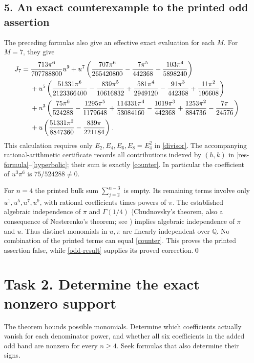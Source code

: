 \documentclass[11pt]{article}
\newcommand{\Q}{\mathbb Q}
\begin{document}
\subsection*{5. An exact counterexample to the printed odd assertion}
The preceding formulas also give an effective exact evaluation for
each $M$. For $M=7$, they give
\begin{align}
 J_7={}&\frac{713\pi^6}{707788800}u^9
 +u^7\left(\frac{707\pi^6}{265420800}
        -\frac{7\pi^5}{442368}+\frac{103\pi^4}{5898240}\right)\notag\\
 &+u^5\left(\frac{51331\pi^6}{2123366400}
       -\frac{839\pi^5}{10616832}+\frac{581\pi^4}{2949120}
       -\frac{91\pi^3}{442368}+\frac{11\pi^2}{196608}\right)\notag\\
 &+u^3\left(\frac{75\pi^6}{524288}-\frac{1295\pi^5}{1179648}
       +\frac{114331\pi^4}{53084160}-\frac{1019\pi^3}{442368}
       +\frac{1253\pi^2}{884736}-\frac{7\pi}{24576}\right)\notag\\
 &+u\left(\frac{51331\pi^2}{8847360}
                         -\frac{839\pi}{221184}\right).\label{counter}
\end{align}
This calculation requires only $E_2,E_4,E_6,E_8=E_4^2$ in
\eqref{divisor}. The accompanying rational-arithmetic certificate
records all contributions indexed by $(h,k)$ in
\eqref{res-formula}--\eqref{hyperbolic}; their sum is exactly
\eqref{counter}. In particular the coefficient of $u^3\pi^6$ is
$75/524288\ne0$.

For $n=4$ the printed bulk sum $\sum_{j=2}^{n-3}$ is empty.
Its remaining terms involve only $u^1,u^5,u^7,u^9$, with rational
coefficients times powers of $\pi$. The established algebraic
independence of $\pi$ and $\Gamma(1/4)$ (Chudnovsky's theorem,
also a consequence of Nesterenko's theorem; see
\cite[p.~85]{Z}) implies algebraic independence of $\pi$ and $u$.
Thus distinct monomials in $u,\pi$ are linearly independent over
$\Q$. No combination of the printed terms can equal
\eqref{counter}. This proves the printed assertion false, while
\eqref{odd-result} supplies its proved correction.\qed

\section*{Task 2. Determine the exact nonzero support}
The theorem bounds possible monomials. Determine which coefficients
actually vanish for each denominator power, and whether all six
coefficients in the added odd band are nonzero for every $n\ge4$.
Seek formulas that also determine their signs.
\end{document}
